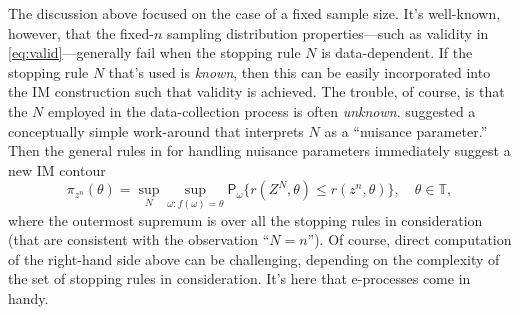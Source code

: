 \documentclass[a4paper, 12pt]{article}
\theoremstyle{plain}
\theoremstyle{definition}
\theoremstyle{remark}
\newcommand{\prob}{\mathsf{P}}
\newcommand{\TT}{\mathbb{T}}
\newcommand{\uPi}{\overline{\Pi}}
\begin{document}
The discussion above focused on the case of a fixed sample size.  It's well-known, however, that the fixed-$n$ sampling distribution properties---such as validity in \eqref{eq:valid}---generally fail when the stopping rule $N$ is data-dependent.  
If the stopping rule $N$ that's used is {\em known}, then this can be easily incorporated into the IM construction such that validity is achieved.  
The trouble, of course, is that the $N$ employed in the data-collection process is often {\em unknown}.
\citet{martin.basu} suggested a conceptually simple work-around that interprets $N$ as a ``nuisance parameter.'' Then the general rules in \citet{martin.partial3} for handling nuisance parameters immediately suggest a new IM contour 
\[ \pi_{z^n}(\theta) = \sup_N \sup_{\omega: f(\omega)=\theta} \prob_\omega\{ r(Z^N,\theta) \leq r(z^n,\theta)\}, \quad \theta \in \TT, \]
where the outermost supremum is over all the stopping rules in consideration (that are consistent with the observation ``$N=n$'').  Of course, direct computation of the right-hand side above can be challenging, depending on the complexity of the set of stopping rules in consideration.  It's here that e-processes come in handy.  
\end{document}
